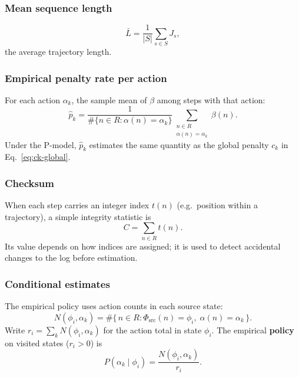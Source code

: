 \documentclass[11pt,a4paper]{article}
\begin{document}
\subsubsection{Mean sequence length}\label{sec:est:meanlen}
\begin{equation}
  \bar{L}=\frac{1}{|S|}\sum_{s\in S} J_s,
  \label{eq:Lbar}
\end{equation}
the average trajectory length.

\subsubsection{Empirical penalty rate per action}\label{sec:est:penrate}
For each action $\alpha_k$, the sample mean of $\beta$ among steps with that
action:
\begin{equation}
  \hat{p}_k
  = \frac{1}{\#\{n\in R : \alpha(n)=\alpha_k\}}
    \sum_{\substack{n\in R \\ \alpha(n)=\alpha_k}} \beta(n).
  \label{eq:penrate}
\end{equation}
Under the P-model, $\hat{p}_k$ estimates the same quantity as the global penalty
$c_k$ in Eq.~\eqref{eq:ck-global}.

\subsubsection{Checksum}\label{sec:est:checksum}
When each step carries an integer index $t(n)$ (e.g.\ position within a
trajectory), a simple integrity statistic is
\begin{equation}
  C=\sum_{n\in R} t(n).
  \label{eq:checksum}
\end{equation}
Its value depends on how indices are assigned; it is used to detect accidental
changes to the log before estimation.

\subsubsection{Conditional estimates}\label{sec:est:conditional}
The empirical policy uses action counts in each source state:
\begin{equation}
  N(\phi_i,\alpha_k)
  = \#\{\, n\in R : \Phi_{\mathrm{src}}(n)=\phi_i,\; \alpha(n)=\alpha_k \,\}.
  \label{eq:N-phi-alpha}
\end{equation}
Write $r_i=\sum_k N(\phi_i,\alpha_k)$ for the action total in state $\phi_i$.
The empirical \textbf{policy} on visited states ($r_i>0$) is
\begin{equation}
  P(\alpha_k\mid\phi_i) = \frac{N(\phi_i,\alpha_k)}{r_i}.
  \label{eq:policy}
\end{equation}
\end{document}
